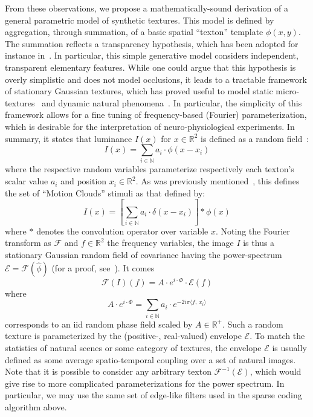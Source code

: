 \documentclass[a4paper, 10pt, twocolumns]{article}
\newcommand{\dotp}[2]{\langle #1,\,#2\rangle}
\newcommand{\eql}[1]{\begin{equation}#1\end{equation}}
\newcommand{\RR}{\ensuremath{\mathbb{R}}}
\newcommand{\NN}{\ensuremath{\mathbb{N}}}
\begin{document}
From these observations, we propose a mathematically-sound derivation of a general parametric model of synthetic textures. This model is defined by aggregation, through summation, of a basic spatial ``texton'' template $\phi(x, y)$. The summation reflects a transparency hypothesis, which has been adopted for instance in~\citep{Galerne11}. In particular, this simple generative model considers independent, transparent elementary features. While one could argue that this hypothesis is overly simplistic and does not model occlusions, it leads to a tractable framework of stationary Gaussian textures, which has proved useful to model static micro-textures~\citep{Galerne11} and dynamic natural phenomena~\citep{2014-xia-siims}. In particular, the simplicity of this framework allows for a fine tuning of frequency-based (Fourier) parameterization, which is desirable for the interpretation of neuro-physiological experiments. In summary, it states that luminance $I(x)$ for $x \in \RR^2$ is defined as a random field~\citep{Vacher15}: \eql{\label{eq-deadleaves}
I (x) = \sum_{i \in \NN} a_i \cdot \phi(x-x_i)} where the respective random variables parameterize respectively each texton's scalar value $a_i$ and position $x_i \in \RR^2$. As was previously mentioned~\citep{Leon12,Vacher15}, this defines the set of ``Motion Clouds'' stimuli as that defined by: \eql{\label{eq-MC} I (x) = [\sum_{i \in \NN} a_i \cdot\delta(x-x_i)] \ast \phi(x) } where $\ast$ denotes the convolution operator over variable $x$. Noting the Fourier transform as $\mathcal{F}$ and $f \in \RR^2$ the frequency variables, the image $I$ is thus a stationary Gaussian random field of covariance having the power-spectrum $\mathcal{E}=\mathcal{F}(\hat{\phi})$ (for a proof, see~\citep{Vacher15}). It comes
\begin{equation*}
  \mathcal{F}(I) (f) = A \cdot e^{i \cdot \Phi} \cdot \mathcal{E} (f)
\end{equation*}
where
\begin{equation*}
A \cdot e^{i \cdot \Phi} = \sum_{i\in\NN} a_i \cdot e^{-2i\pi \dotp{f}{x_i}}
\end{equation*}
corresponds to an iid random phase field scaled by $A \in \RR^+$. Such a random texture is parameterized by the (positive-, real-valued) envelope $\mathcal{E}$. To match the statistics of natural scenes or some category of textures, the envelope $\mathcal{E}$ is usually defined as some average spatio-temporal coupling over a set of natural images. Note that it is possible to consider any arbitrary texton $\mathcal{F}^{-1}(\mathcal{E})$, which would give rise to more complicated parameterizations for the power spectrum. In particular, we may use the same set of edge-like filters used in the sparse coding algorithm above.
\end{document}
